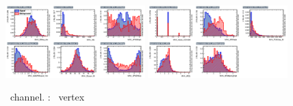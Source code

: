 \begin{figure}[htbp]
	\includegraphics[width=0.48\textwidth]{6_Search/Figures/MVAtechnics/toppairzut/eeu/variables_id_c1.png}
	\includegraphics[width=0.48\textwidth]{6_Search/Figures/MVAtechnics/toppairzut/eeu/variables_id_c2.png}
	\caption{\eemu\ channel. \TTSR: \Zut\ vertex }
	\label{image:Figureseeutoppairzut}
\end{figure}


